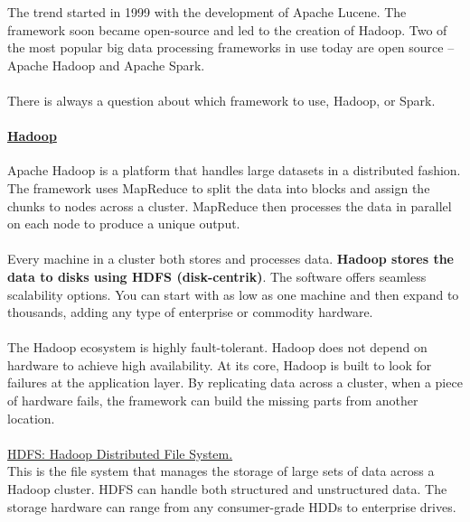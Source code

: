\documentclass[10pt,a4paper]{article}
\newcommand{\nline}{\\~\\}
\begin{document}
The trend started in 1999 with the development of Apache Lucene. The framework soon became open-source and led to the creation of Hadoop. Two of the most popular big data processing frameworks in use today are open source – Apache Hadoop and Apache Spark.
\nline
There is always a question about which framework to use, Hadoop, or Spark.
\paragraph{\uline{Hadoop}}
Apache Hadoop is a platform that handles large datasets in a distributed fashion. The framework uses MapReduce to split the data into blocks and assign the chunks to nodes across a cluster. MapReduce then processes the data in parallel on each node to produce a unique output. 
\nline
Every machine in a cluster both stores and processes data. \textbf{Hadoop stores the data to disks using HDFS (disk-centrik)}. The software offers seamless scalability options. You can start with as low as one machine and then expand to thousands, adding any type of enterprise or commodity hardware.
\nline
The Hadoop ecosystem is highly fault-tolerant. Hadoop does not depend on hardware to achieve high availability. At its core, Hadoop is built to look for failures at the application layer. By replicating data across a cluster, when a piece of hardware fails, the framework can build the missing parts from another location.
\nline
\uline{HDFS: Hadoop Distributed File System.} \\
This is the file system that manages the storage of large sets of data across a Hadoop cluster. HDFS can handle both structured and unstructured data. The storage hardware can range from any consumer-grade HDDs to enterprise drives.
\end{document}
